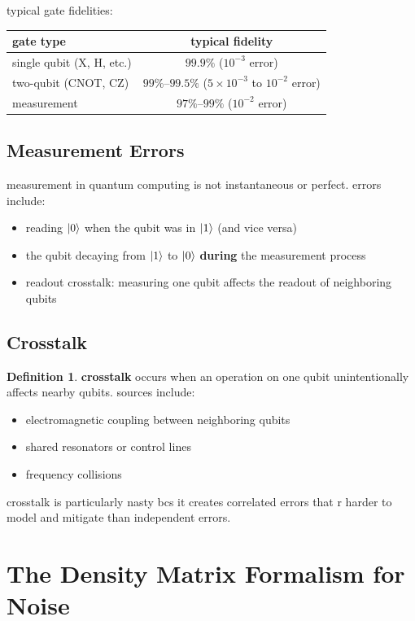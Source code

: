 \documentclass[11pt,a4paper]{article}
\theoremstyle{definition}
\newtheorem{definition}{Definition}[section]
\theoremstyle{remark}
\begin{document}
typical gate fidelities:
\begin{center}
\begin{tabular}{l|c}
gate type & typical fidelity \\
\hline
single qubit (X, H, etc.) & $99.9\%$ ($10^{-3}$ error) \\
two-qubit (CNOT, CZ) & $99\%$--$99.5\%$ ($5 \times 10^{-3}$ to $10^{-2}$ error) \\
measurement & $97\%$--$99\%$ ($10^{-2}$ error)
\end{tabular}
\end{center}

\subsection{Measurement Errors}

measurement in quantum computing is not instantaneous or perfect. errors include:
\begin{itemize}
    \item reading $\ket{0}$ when the qubit was in $\ket{1}$ (and vice versa)
    \item the qubit decaying from $\ket{1}$ to $\ket{0}$ \textbf{during} the measurement process
    \item readout crosstalk: measuring one qubit affects the readout of neighboring qubits
\end{itemize}

\subsection{Crosstalk}

\begin{definition}
\textbf{crosstalk} occurs when an operation on one qubit unintentionally affects nearby qubits. sources include:
\begin{itemize}
    \item electromagnetic coupling between neighboring qubits
    \item shared resonators or control lines
    \item frequency collisions
\end{itemize}
\end{definition}

crosstalk is particularly nasty bcs it creates correlated errors that r harder to model and mitigate than independent errors.

\section{The Density Matrix Formalism for Noise}
\end{document}
